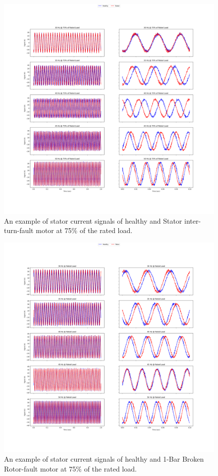 \pagebreak
\begin{figure}[h]
	\centering
	\includegraphics[width=0.8\paperwidth,keepaspectratio=true]{./fig/stator_75.png}
	\caption{An example of stator current signals of healthy and Stator inter-turn-fault motor at 75$\%$ of the rated load.}	
	\label{stator75}
\end{figure}
\pagebreak
\begin{figure}[h]
	\centering
	\includegraphics[width=0.8\paperwidth,keepaspectratio=true]{./fig/rotor_100.png}
	\caption{An example of stator current signals of healthy and 1-Bar Broken Rotor-fault motor at 75$\%$ of the rated load.}	
	\label{rotor100}
\end{figure}

